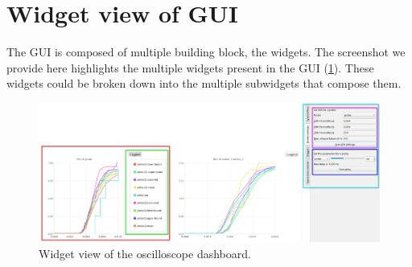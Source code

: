\section{Widget view of GUI} \label{app:dash_wid}
    The GUI is composed of multiple building block, the widgets. The screenshot we provide here highlights the multiple widgets present in the GUI (\cref{fig:osc_widgs}). These widgets could be broken down into the multiple subwidgets that compose them.

    \begin{figure}[H]
        \begin{center}
            \includegraphics[width = \textwidth]{img/example_osc.png}
        \end{center}
        \caption{Widget view of the oscilloscope dashboard.}
        \label{fig:osc_widgs}
    \end{figure}


